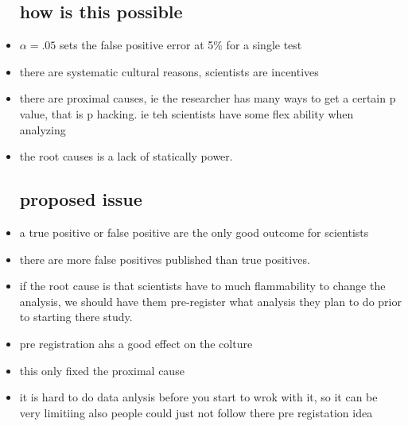 \documentclass{article}
\begin{document}
\begin{itemize}
\subsection{how is this possible}
\item $\alpha=.05$ sets the false positive error at 5\% for a single test
\item there are systematic cultural reasons, scientists are incentives 
\item there are proximal causes, ie the researcher has many ways to get a certain p value, that is p hacking. ie teh scientists have some flex ability when analyzing 
\item the root causes is a lack of statically power. 
\subsection{proposed issue}
    \item a true positive or false positive are the only good outcome for scientists
    \item there are more false positives published than true positives. 
    \item if the root cause is that scientists have to much flammability to change the analysis, we should have them pre-register what analysis they plan to do prior to starting there study. 
    \item pre registration ahs a good effect on the colture 
    \item this only fixed the proximal cause
    \item it is hard to do data anlysis before you start to wrok with it, so it can be very limitiing 
    \itme also people could just not follow there pre registation idea

\end{itemize}
\end{document}
